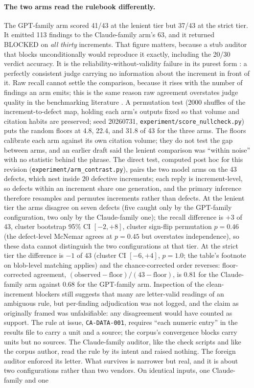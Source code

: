 \documentclass[11pt]{article}
\newcommand{\rulename}[1]{\texttt{#1}}
\begin{document}
\paragraph{The two arms read the rulebook differently.} The GPT-family arm scored 41/43 at the lenient tier but 37/43 at the strict tier. It emitted 113 findings to the Claude-family arm's 63, and it returned BLOCKED on \emph{all thirty} increments. That figure matters, because a stub auditor that blocks unconditionally would reproduce it exactly, including the 20/30 verdict accuracy. It is the reliability-without-validity failure in its purest form \cite{norman2026reliability}: a perfectly consistent judge carrying no information about the increment in front of it. Raw recall cannot settle the comparison, because it rises with the number of findings an arm emits; this is the same reason raw agreement overstates judge quality in the benchmarking literature \cite{norman2026reliability}. A permutation test (2000 shuffles of the increment-to-defect map, holding each arm's outputs fixed so that volume and citation habits are preserved; seed 20260731, \texttt{experiment/score\_nullcheck.py}) puts the random floors at 4.8, 22.4, and 31.8 of 43 for the three arms. The floors calibrate each arm against its own citation volume; they do not test the gap between arms, and an earlier draft said the lenient comparison was ``within noise'' with no statistic behind the phrase. The direct test, computed post hoc for this revision (\texttt{experiment/arm\_contrast.py}), pairs the two model arms on the 43 defects, which nest inside 20 defective increments; each reply is increment-level, so defects within an increment share one generation, and the primary inference therefore resamples and permutes increments rather than defects. At the lenient tier the arms disagree on seven defects (five caught only by the GPT-family configuration, two only by the Claude-family one); the recall difference is $+3$ of 43, cluster bootstrap 95\% CI $[-2, +8]$, cluster sign-flip permutation $p=0.46$ (the defect-level McNemar agrees at $p=0.45$ but overstates independence), so these data cannot distinguish the two configurations at that tier. At the strict tier the difference is $-1$ of 43 (cluster CI $[-6, +4]$, $p=1.0$; the table's footnote on blob-level matching applies) and the chance-corrected order reverses: floor-corrected agreement, $(\mathrm{observed}-\mathrm{floor})/(43-\mathrm{floor})$, is 0.81 for the Claude-family arm against 0.68 for the GPT-family arm. Inspection of the clean-increment blockers still suggests that many are letter-valid readings of an ambiguous rule, but per-finding adjudication was not logged, and the claim as originally framed was unfalsifiable: any disagreement would have counted as support. The rule at issue, \rulename{CA-DATA-001}, requires ``each numeric entry'' in the results file to carry a unit and a source; the corpus's convergence blocks carry units but no sources. The Claude-family auditor, like the check scripts and like the corpus author, read the rule by its intent and raised nothing. The foreign auditor enforced its letter. What survives is narrower but real, and it is about two configurations rather than two vendors. On identical inputs, one Claude-family and one 
\end{document}
